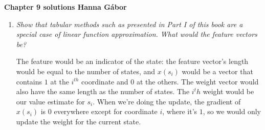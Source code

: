 \documentclass[12pt,a4paper]{article}
\begin{document}
\textbf{Chapter 9 solutions  \hfill Hanna Gábor}

\begin{enumerate}
  \item \textit{Show that tabular methods such as presented in Part I of this book are a
    special case of linear function approximation. What would the feature vectors be?}
    
    The feature would be an indicator of the state: the feature vector's length would be
    equal to the number of states, and $x(s_i)$ would be a vector that contains $1$ at
    the $i^{th}$ coordinate and $0$ at the others. The weight vector would also have
    the same length as the number of states. The $i^th$ weight would be our value estimate
    for $s_i$. When we're doing the update, the gradient of $x(s_i)$ is $0$ everywhere except
    for coordinate $i$, where it's $1$, so we would only update the weight for the current state.
    
\end{enumerate}
\end{document}
